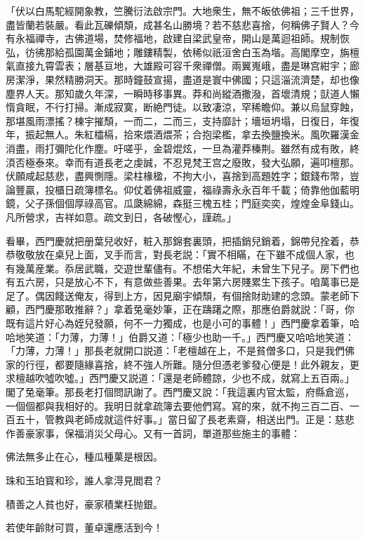 \begin{myquote}
「伏以白馬駝經開象教，竺騰衍法啟宗門。大地衆生，無不皈依佛祖；三千世界，盡皆蘭若裝嚴。看此瓦礫傾頽，成甚名山勝境？若不慈悲喜捨，何稱佛子賢人？今有永福禪寺，古佛道場，焚修福地，啟建自梁武皇帝，開山是萬迴祖師。規制恢弘，彷彿那給孤園萬金鋪地；雕鏤精製，依稀似祇洹舍白玉為堦。高閣摩空，旃檀氣直接九霄雲表；層基亘地，大雄殿可容千衆禪僧。兩翼嵬峨，盡是琳宫紺宇；廊房潔淨，果然精勝洞天。那時鐘鼓宣揚，盡道是寰中佛國；只這淄流濟楚，却也像塵界人天。那知歲久年深，一瞬時移事異。莽和尚縱酒撒潑，首壞清規；獃道人懶惰貪眠，不行打掃。漸成寂寞，断絶門徒。以致凄涼，罕稀瞻仰。兼以烏鼠穿蝕，那堪風雨漂搖？棟宇摧頹，一而二，二而三，支持靡計；墻垣坍塌，日復日，年復年，振起無人。朱紅櫺槅，拾來煨酒煨茶；合抱梁檻，拿去換鹽換米。風吹羅漢金消盡，雨打彌陀化作塵。吁嗟乎，金碧焜炫，一旦為灌莽榛荆。雖然有成有敗，終湏否極泰來。幸而有道長老之虔誠，不忍見梵王宫之廢敗，發大弘願，遍叩檀那。伏願咸起慈悲，盡興惻隱。梁柱椽楹，不拘大小，喜捨到高題姓字；銀錢布幣，豈論豐贏，投櫃日疏簿標名。仰仗着佛祖威靈，福祿壽永永百年千載；倚靠他伽藍明鏡，父子孫個個厚祿高官。瓜瓞綿綿，森挺三槐五桂；門庭奕奕，煌煌金阜錢山。凡所營求，吉祥如意。疏文到日，各破慳心，謹疏。」
\end{myquote}

看畢，西門慶就把册葉兒收好，粧入那錦套裏頭，把插銷兒銷着，錦帶兒拴着，恭恭敬敬放在桌兒上面，叉手而言，對長老説：「實不相瞞，在下雖不成個人家，也有幾萬産業。忝居武職，交遊世輩儘有。不想偌大年紀，未曾生下兒子。房下們也有五六房，只是放心不下，有意做些善果。去年第六房賤累生下孩子。咱萬事已是足了。偶因餞送俺友，得到上方，因見廟宇傾頹，有個捨財助建的念頭。蒙老師下顧，西門慶那敢推辭？」拿着兔毫妙筆，正在躊躇之際，那應伯爵就説：「哥，你既有這片好心為姪兒發願，何不一力獨成，也是小可的事體！」西門慶拿着筆，哈哈地笑道：「力薄，力薄！」伯爵又道：「極少也助一千。」西門慶又哈哈地笑道：「力薄，力薄！」那長老就開口説道：「老檀越在上，不是貧僧多口，只是我們佛家的行徑，都要隨緣喜捨，終不強人所難。隨分但憑老爹發心便是！此外親友，更求檀越吹噓吹噓。」西門慶又説道：「還是老師體諒，少也不成，就寫上五百兩。」閣了兔毫筆。那長老打個問訊謝了。西門慶又說：「我這裏内官太監，府縣倉巡，一個個都與我相好的。我明日就拿疏簿去要他們寫。寫的來，就不拘三百二百、一百五十，管教與老師成就這件好事。」當日留了長老素齋，相送出門。正是：慈悲作善豪家事，保福消災父母心。又有一首詞，單道那些施主的事體：

\begin{myquote}
佛法無多止在心，種瓜種菓是根因。

珠和玉珀寳和珍，誰人拿淂見閻君？

積善之人貧也好，豪家積業枉抛銀。

若使年齡財可買，董卓還應活到今！
\end{myquote}

